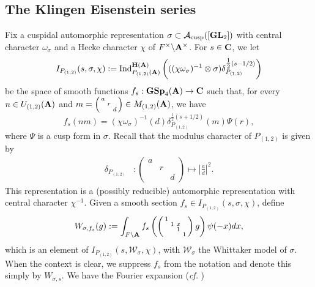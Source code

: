 \documentclass[11pt, reqno]{amsart}
\theoremstyle{plain}
\theoremstyle{definition}
\theoremstyle{remark}
\theoremstyle{plain}
\def\C{{\bf C}}
\def\H{{H}}
\def\A{{\bf A}}
\def\H{\mathbf{H}}
\def\GSp{{\mathbf{GSp}}}
\def\GL{\mathbf{GL}}
\begin{document}
\subsection{The Klingen Eisenstein series}\label{Section:Klingen:Eisenstein}
Fix a cuspidal automorphic representation $\sigma \subset \mathcal{A}_{\rm cusp}([\GL_2])$ with central character $\omega_\sigma$ and a Hecke character $\chi$ of $F^\times \backslash \A^\times$. For $s \in \C$, we let
\begin{equation}\label{induction:Klingen}
I_{P_{(1,2)}}(s,\sigma, \chi) := {\rm Ind}_{P_{(1,2)}(\A)}^{\H(\A)}\left( ((\chi\omega_{\sigma})^{-1}\otimes{\sigma}) \delta_{P_{(1,2)}}^{\tfrac{1}{2}(s-1/2) } \right)\end{equation}be the space of smooth functions $f_s:\GSp_4(\A)\to \C$ such that, for every $ n \in U_{(1,2)}(\A)$ and $  m = \left(\begin{smallmatrix} a &  &  \\ & r & \\  & & d \end{smallmatrix} \right) \in M_{(1,2)}(\A)$, we have
\[f_{s}(nm) = (\chi\omega_{\sigma})^{-1}(d)\delta_{P_{(1,2)}}^{\tfrac{1}{2}(s + 1/2)}(m)\Psi(r),\]
where $\Psi$ is a cusp form in $\sigma$. Recall that the modulus character of $P_{(1,2)}$ is given by \begin{align*}
\delta_{P_{(1,2)}}&:\left(\begin{smallmatrix} a &  &  \\ & r & \\  & & d \end{smallmatrix} \right)  \mapsto \left|\tfrac{a}{d}\right|^2.
\end{align*}
This representation is a (possibly reducible) automorphic representation with central character $\chi^{-1}$. 
Given a smooth section $ f_s \in I_{P_{(1,2)}}(s,\sigma,\chi)$, define \begin{align}\label{WhittakerFoRKES}
    W_{\sigma,f_s}(g) : = \int_{F \backslash \A} f_s \left(\left(\begin{smallmatrix}1& & & \\ &1&x& \\ & &1& \\ & & &1\end{smallmatrix}\right)g\right)\psi(-x)dx,
\end{align}  
which is an element of $I_{P_{(1,2)}}(s,\mathcal{W}_{\sigma},\chi)$, with $\mathcal{W}_\sigma$ the Whittaker model of $\sigma$.  When the context is clear, we suppress $f_s$ from the notation and denote this simply by $W_{\sigma,s}$. We have the Fourier expansion (\textit{cf.} \cite[(10.4)]{BumpBook})
\end{document}
